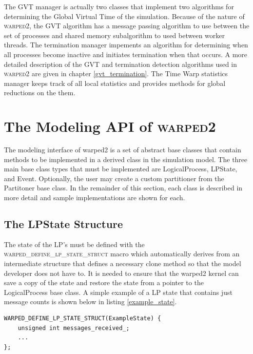 \documentclass[11pt]{book}
\begin{document}
The GVT manager is actually two classes that implement two algorithms for determining the Global
Virtual Time of the simulation. Because of the nature of \textsc{warped2}, the GVT algorithm has
a message passing algorithm to use between the set of processes and shared memory subalgorithm
to used between worker threads. The termination manager impements an algorithm for determining
when all processes become inactive and initiates termination when that occurs. A more detailed
description of the GVT and termination detection algorithms used in \textsc{warped2} are given
in chapter \ref{gvt_termination}. The Time Warp statistics manager keeps track of all local
statistics and provides methods for global reductions on the them. 

\section{The Modeling API of \textsc{warped2}}

The modeling interface of warped2 is a set of abstract base classes that contain methods
to be implemented in a derived class in the simulation model. The three main base class
types that must be implemented are LogicalProcess, LPState, and Event. Optionally, the user
may create a custom partitioner from the Partitoner base class. In the remainder of this
section, each class is described in more detail and sample implementations are shown for each.

\subsection{The LPState Structure}

The state of the LP's must be defined with the \textsc{warped\_define\_lp\_state\_struct}
macro which automatically derives from an intermediate structure that defines a necessary
clone method so that the model developer does not have to. It is needed to ensure that the warped2
kernel can save a copy of the state and restore the state from a pointer to the LogicalProcess
base class. A simple example of a LP state that contains just message counts is shown below in
listing \ref{example_state}.

\begin{lstlisting}[caption=Example \textsc{warped2} State Definition, label=example_state, float]
WARPED_DEFINE_LP_STATE_STRUCT(ExampleState) {
    unsigned int messages_received_;
    ...
};
\end{lstlisting}
\end{document}
